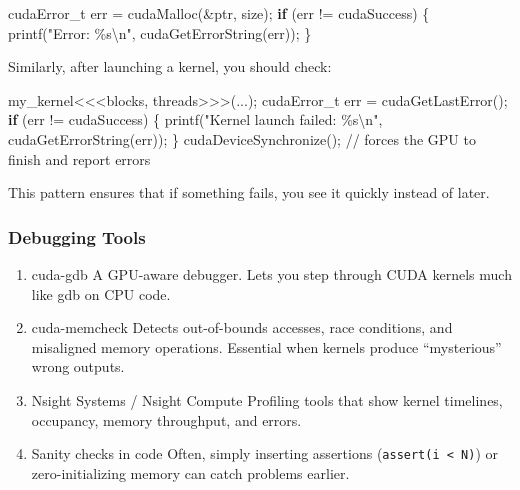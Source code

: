 \documentclass[
  letterpaper,
  DIV=11,
  numbers=noendperiod]{scrreprt}
\newenvironment{Shaded}{\begin{snugshade}}{\end{snugshade}}
\newcommand{\CommentTok}[1]{\textcolor[rgb]{0.37,0.37,0.37}{#1}}
\newcommand{\ControlFlowTok}[1]{\textcolor[rgb]{0.00,0.23,0.31}{\textbf{#1}}}
\newcommand{\NormalTok}[1]{\textcolor[rgb]{0.00,0.23,0.31}{#1}}
\newcommand{\OperatorTok}[1]{\textcolor[rgb]{0.37,0.37,0.37}{#1}}
\newcommand{\SpecialCharTok}[1]{\textcolor[rgb]{0.37,0.37,0.37}{#1}}
\newcommand{\StringTok}[1]{\textcolor[rgb]{0.13,0.47,0.30}{#1}}
\begin{document}
\begin{Shaded}
\begin{Highlighting}[]
\NormalTok{cudaError\_t err }\OperatorTok{=}\NormalTok{ cudaMalloc}\OperatorTok{(\&}\NormalTok{ptr}\OperatorTok{,}\NormalTok{ size}\OperatorTok{);}
\ControlFlowTok{if} \OperatorTok{(}\NormalTok{err }\OperatorTok{!=}\NormalTok{ cudaSuccess}\OperatorTok{)} \OperatorTok{\{}
\NormalTok{    printf}\OperatorTok{(}\StringTok{"Error: }\SpecialCharTok{\%s\textbackslash{}n}\StringTok{"}\OperatorTok{,}\NormalTok{ cudaGetErrorString}\OperatorTok{(}\NormalTok{err}\OperatorTok{));}
\OperatorTok{\}}
\end{Highlighting}
\end{Shaded}

Similarly, after launching a kernel, you should check:

\begin{Shaded}
\begin{Highlighting}[]
\NormalTok{my\_kernel}\OperatorTok{\textless{}\textless{}\textless{}}\NormalTok{blocks}\OperatorTok{,}\NormalTok{ threads}\OperatorTok{\textgreater{}\textgreater{}\textgreater{}(...);}
\NormalTok{cudaError\_t err }\OperatorTok{=}\NormalTok{ cudaGetLastError}\OperatorTok{();}
\ControlFlowTok{if} \OperatorTok{(}\NormalTok{err }\OperatorTok{!=}\NormalTok{ cudaSuccess}\OperatorTok{)} \OperatorTok{\{}
\NormalTok{    printf}\OperatorTok{(}\StringTok{"Kernel launch failed: }\SpecialCharTok{\%s\textbackslash{}n}\StringTok{"}\OperatorTok{,}\NormalTok{ cudaGetErrorString}\OperatorTok{(}\NormalTok{err}\OperatorTok{));}
\OperatorTok{\}}
\NormalTok{cudaDeviceSynchronize}\OperatorTok{();} \CommentTok{// forces the GPU to finish and report errors}
\end{Highlighting}
\end{Shaded}

This pattern ensures that if something fails, you see it quickly instead
of later.

\subsubsection{Debugging Tools}\label{debugging-tools}

\begin{enumerate}
\def\labelenumi{\arabic{enumi}.}
\item
  cuda-gdb A GPU-aware debugger. Lets you step through CUDA kernels much
  like gdb on CPU code.
\item
  cuda-memcheck Detects out-of-bounds accesses, race conditions, and
  misaligned memory operations. Essential when kernels produce
  ``mysterious'' wrong outputs.
\item
  Nsight Systems / Nsight Compute Profiling tools that show kernel
  timelines, occupancy, memory throughput, and errors.
\item
  Sanity checks in code Often, simply inserting assertions
  (\texttt{assert(i\ \textless{}\ N)}) or zero-initializing memory can
  catch problems earlier.
\end{enumerate}
\end{document}

